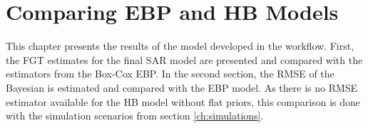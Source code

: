 \chapter{Comparing EBP and HB Models}

This chapter presents the results of the model developed in the workflow.
First, the FGT estimates for the final SAR model are presented and compared with the estimators from the Box-Cox EBP.
In the second section, the RMSE of the Bayesian is estimated and compared with the EBP model.
As there is no RMSE estimator available for the HB model without flat priors, this comparison is done with the simulation scenarios from section \ref{ch:simulations}.









